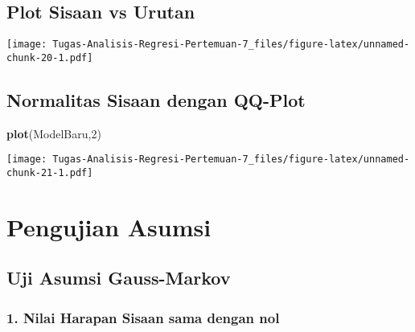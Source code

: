 \documentclass[
]{article}
\newenvironment{Shaded}{\begin{snugshade}}{\end{snugshade}}
\newcommand{\AttributeTok}[1]{\textcolor[rgb]{0.13,0.29,0.53}{#1}}
\newcommand{\DecValTok}[1]{\textcolor[rgb]{0.00,0.00,0.81}{#1}}
\newcommand{\FunctionTok}[1]{\textcolor[rgb]{0.13,0.29,0.53}{\textbf{#1}}}
\newcommand{\NormalTok}[1]{#1}
\newcommand{\SpecialCharTok}[1]{\textcolor[rgb]{0.81,0.36,0.00}{\textbf{#1}}}
\newcommand{\StringTok}[1]{\textcolor[rgb]{0.31,0.60,0.02}{#1}}
\begin{document}
\hypertarget{plot-sisaan-vs-urutan-1}{%
\subsection{Plot Sisaan vs Urutan}\label{plot-sisaan-vs-urutan-1}}

\begin{Shaded}
\end{Shaded}

\texttt{[image: Tugas-Analisis-Regresi-Pertemuan-7\_files/figure-latex/unnamed-chunk-20-1.pdf]}

\hypertarget{normalitas-sisaan-dengan-qq-plot-1}{%
\subsection{Normalitas Sisaan dengan
QQ-Plot}\label{normalitas-sisaan-dengan-qq-plot-1}}

\begin{Shaded}
\begin{Highlighting}[]
\FunctionTok{plot}\NormalTok{(ModelBaru,}\DecValTok{2}\NormalTok{)}
\end{Highlighting}
\end{Shaded}

\texttt{[image: Tugas-Analisis-Regresi-Pertemuan-7\_files/figure-latex/unnamed-chunk-21-1.pdf]}

\hypertarget{pengujian-asumsi-1}{%
\section{Pengujian Asumsi}\label{pengujian-asumsi-1}}

\hypertarget{uji-asumsi-gauss-markov-1}{%
\subsection{Uji Asumsi Gauss-Markov}\label{uji-asumsi-gauss-markov-1}}

\hypertarget{nilai-harapan-sisaan-sama-dengan-nol-1}{%
\subsubsection{1. Nilai Harapan Sisaan sama dengan
nol}\label{nilai-harapan-sisaan-sama-dengan-nol-1}}
\end{document}
